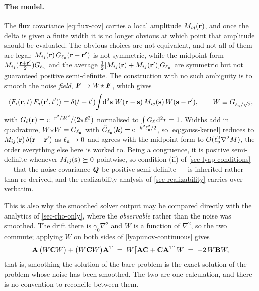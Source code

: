 \documentclass[a5paper]{article}
\begin{document}
\paragraph{The model.} The flux covariance \eqref{eq:flux-cov} carries a local amplitude $M_{ij}(\mathbf{r})$, and once the delta is given a finite width it is no longer obvious at which point that amplitude should be evaluated. The obvious choices are not equivalent, and not all of them are legal: $M_{ij}(\mathbf{r})\,G_{\ell_{\rm n}}(\mathbf{r}-\mathbf{r}')$ is not symmetric, while the midpoint form $M_{ij}(\tfrac{\mathbf{r}+\mathbf{r}'}{2})G_{\ell_{\rm n}}$ and the average $\tfrac12[M_{ij}(\mathbf{r})+M_{ij}(\mathbf{r}')]G_{\ell_{\rm n}}$ are symmetric but not guaranteed positive semi-definite. The construction with no such ambiguity is to smooth the noise \emph{field}, $\boldsymbol F\to W\!\star\boldsymbol F$, which gives
\begin{equation}
    \label{eq:gauss-kernel}
    \left\langle F_i(\mathbf{r},t)\,F_j(\mathbf{r}',t')\right\rangle = \delta(t-t')\!\int\!\mathrm{d}^2\mathbf{s}\;W(\mathbf{r}-\mathbf{s})\,M_{ij}(\mathbf{s})\,W(\mathbf{s}-\mathbf{r}'),
    \qquad
    W \equiv G_{\ell_{\rm n}/\sqrt2},
\end{equation}
with $G_\ell(\mathbf{r}) = \mathrm{e}^{-r^2/2\ell^2}/(2\pi\ell^2)$ normalised to $\int G_\ell\,\mathrm{d}^2r = 1$. Widths add in quadrature, $W\!\star\!W = G_{\ell_{\rm n}}$ with $\tilde G_{\ell_{\rm n}}(\boldsymbol{k}) = \mathrm{e}^{-k^2\ell_{\rm n}^2/2}$, so \eqref{eq:gauss-kernel} reduces to $M_{ij}(\mathbf{r})\,\delta(\mathbf{r}-\mathbf{r}')$ as $\ell_{\rm n}\to0$ and agrees with the midpoint form to $O(\ell_{\rm n}^2\nabla^2M)$, the order everything else here is worked to. Being a congruence, it is positive semi-definite whenever $M_{ij}(\mathbf{s})\succeq0$ pointwise, so condition (ii) of \cref{sec-lyap-conditions} --- that the noise covariance $\boldsymbol Q$ be positive semi-definite --- is inherited rather than re-derived, and the realizability analysis of \cref{sec-realizability} carries over verbatim.

This is also why the smoothed solver output may be compared directly with the analytics of \cref{sec-rho-only}, where the \emph{observable} rather than the noise was smoothed. The drift there is $\gamma_0\nabla^2$ and $W$ is a function of $\nabla^2$, so the two commute; applying $W$ on both sides of \eqref{lyapunov-continuous} gives
\begin{equation}
    \label{eq:W-commutes}
    \mathbf{A}\,\bigl(W\mathbf{C}W\bigr) + \bigl(W\mathbf{C}W\bigr)\mathbf{A}^{\mathrm{T}}
    \;=\; W\bigl[\mathbf{A}\mathbf{C}+\mathbf{C}\mathbf{A}^{\mathrm{T}}\bigr]W
    \;=\; -2\,W\mathbf{B} W,
\end{equation}
that is, smoothing the solution of the bare problem is the exact solution of the problem whose noise has been smoothed. The two are one calculation, and there is no convention to reconcile between them.
\end{document}
